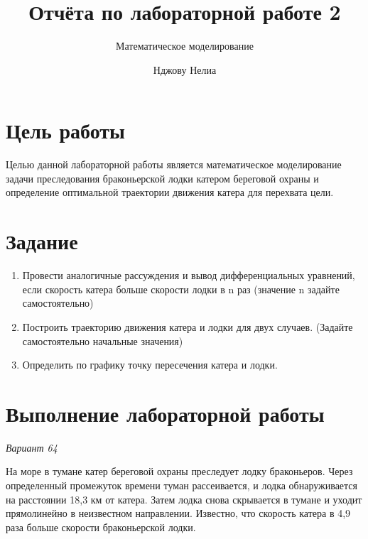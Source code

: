 \documentclass[
  12pt,
  a4paper,
  DIV=11,
  numbers=noendperiod]{scrreprt}
\title{Отчёта по лабораторной работе 2}
\subtitle{Математическое моделирование}
\author{Нджову Нелиа}
\date{}
\renewcommand*\contentsname{Содержание}
\newcommand\contentsname{Содержание}
\begin{document}
\maketitle

\renewcommand*\contentsname{Содержание}
{
\setcounter{tocdepth}{1}
\tableofcontents
}
\listoffigures
\listoftables
{}
\chapter{Цель
работы}\label{ux446ux435ux43bux44c-ux440ux430ux431ux43eux442ux44b}

Целью данной лабораторной работы является математическое моделирование
задачи преследования браконьерской лодки катером береговой охраны и
определение оптимальной траектории движения катера для перехвата цели.

\chapter{Задание}\label{ux437ux430ux434ux430ux43dux438ux435}

\begin{enumerate}
\def\labelenumi{\arabic{enumi}.}
\item
  Провести аналогичные рассуждения и вывод дифференциальных уравнений,
  если скорость катера больше скорости лодки в n раз (значение n задайте
  самостоятельно)
\item
  Построить траекторию движения катера и лодки для двух случаев.
  (Задайте самостоятельно начальные значения)
\item
  Определить по графику точку пересечения катера и лодки.
\end{enumerate}

\chapter{Выполнение лабораторной
работы}\label{ux432ux44bux43fux43eux43bux43dux435ux43dux438ux435-ux43bux430ux431ux43eux440ux430ux442ux43eux440ux43dux43eux439-ux440ux430ux431ux43eux442ux44b}

\emph{Вариант 64}

На море в тумане катер береговой охраны преследует лодку браконьеров.
Через определенный промежуток времени туман рассеивается, и лодка
обнаруживается на расстоянии 18,3 км от катера. Затем лодка снова
скрывается в тумане и уходит прямолинейно в неизвестном направлении.
Известно, что скорость катера в 4,9 раза больше скорости браконьерской
лодки.
\end{document}
